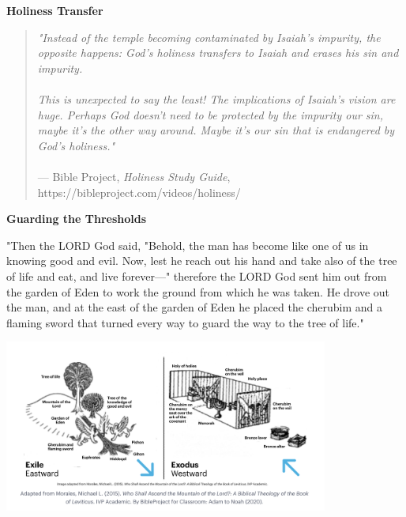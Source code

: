 \documentclass[11pt]{article}
\begin{document}
{\vspace{2em}}
{\large\bfseries Holiness Transfer}

{\vspace{1em}}

\begin{quote}
\textit{"Instead of the temple becoming contaminated
by Isaiah’s impurity, the opposite happens: God’s
holiness transfers to Isaiah and erases his sin and
impurity.\\\\This is unexpected to say the least! The implications of Isaiah's vision are huge.
  Perhaps God doesn't need to be protected by the impurity our
  sin, maybe it's the other way around. Maybe it's our sin that
   is endangered by God's holiness."}\\\\
\hfill --- Bible Project, \textit{Holiness Study Guide}, https://bibleproject.com/videos/holiness/
\end{quote}


{\vspace{2em}}
{\large\bfseries Guarding the Thresholds}


{\vspace{1em}}


\begin{versesection}{2em}

 "Then the LORD God said, "Behold, the man has become like one of us in knowing good and evil. Now, lest he reach out his hand and take also of the tree of life and eat, and live forever—"  therefore the LORD God sent him out from the garden of Eden to work the ground from which he was taken.  He drove out the man, and at the east of the garden of Eden he placed the cherubim and a flaming sword that turned every way to guard the way to the tree of life."

\end{versesection}


\begin{center}
\includegraphics[width=0.8\textwidth]{eden-temple.png}
\end{center}
\end{document}
